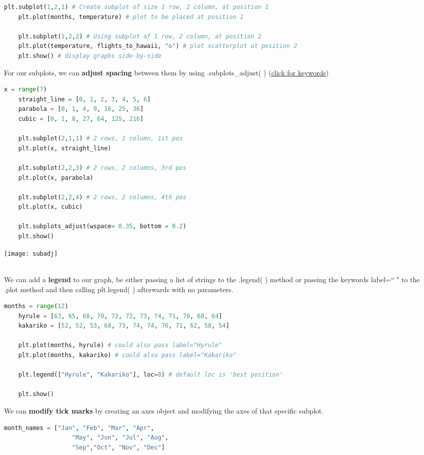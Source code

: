 \documentclass[11pt, a4paper]{article}
\begin{document}
\begin{spacing}{1.1}
\begin{lstlisting}[language=Python]
	plt.subplot(1,2,1) # Create subplot of size 1 row, 2 column, at position 1
	plt.plot(months, temperature) # plot to be placed at position 1
	
	plt.subplot(1,2,2) # Using subplot of 1 row, 2 column, at position 2
	plt.plot(temperature, flights_to_hawaii, "o") # plot scatterplot at position 2
	plt.show() # display graphs side-by-side \end{lstlisting} \newpage
	\noindent For our subplots, we can \textbf{adjust spacing} between them by using .subplots\_adjust( ) (\href{https://matplotlib.org/api/_as_gen/matplotlib.pyplot.subplots_adjust.html}{click for keywords})
	\begin{minipage}[c]{10cm}
	\begin{lstlisting}[language=Python]
	x = range(7)
	straight_line = [0, 1, 2, 3, 4, 5, 6]
	parabola = [0, 1, 4, 9, 16, 25, 36]
	cubic = [0, 1, 8, 27, 64, 125, 216]
		
	plt.subplot(2,1,1) # 2 rows, 1 column, 1st pos
	plt.plot(x, straight_line)
		
	plt.subplot(2,2,3) # 2 rows, 2 columns, 3rd pos
	plt.plot(x, parabola)
		
	plt.subplot(2,2,4) # 2 rows, 2 columns, 4th pos
	plt.plot(x, cubic)
		
	plt.subplots_adjust(wspace= 0.35, bottom = 0.2)
	plt.show() \end{lstlisting}\vspace*{1mm}
	\end{minipage}
	\begin{minipage}[c]{7cm}
		\texttt{[image: subadj]}
	\end{minipage} \\
	We can add a \textbf{legend} to our graph, be either passing a list of strings to the .legend( ) method or passing the keywords label=`` " to the .plot method and then calling plt.legend( ) afterwards with no parameters.
	\begin{lstlisting}[language=Python]
	months = range(12)
	hyrule = [63, 65, 68, 70, 72, 72, 73, 74, 71, 70, 68, 64]
	kakariko = [52, 52, 53, 68, 73, 74, 74, 76, 71, 62, 58, 54]
	
	plt.plot(months, hyrule) # could also pass label="Hyrule"
	plt.plot(months, kakariko) # could also pass label="Kakariko"
	
	plt.legend(["Hyrule", "Kakariko"], loc=8) # default loc is 'best position'
	
	plt.show() \end{lstlisting}\vspace*{1mm}
	We can \textbf{modify tick marks} by creating an axes object and modifying the axes of that specific subplot.
	\begin{minipage}[c]{10cm}
	\begin{lstlisting}[language=Python]
	month_names = ["Jan", "Feb", "Mar", "Apr", 
	               "May", "Jun", "Jul", "Aug", 
	               "Sep","Oct", "Nov", "Dec"]
	

\end{lstlisting}
\end{minipage}
\end{spacing}
\end{document}
